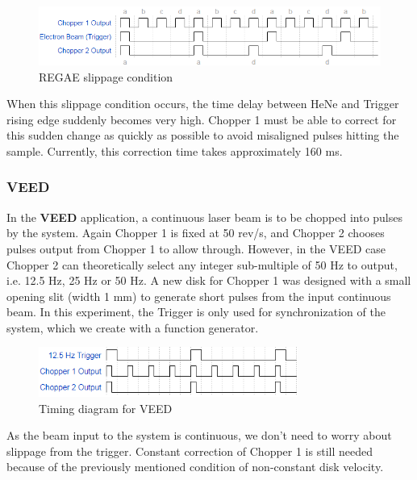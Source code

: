 \documentclass{article}
\begin{document}
        \begin{figure}[h]
            \centering
            \includegraphics[width=12.5cm]{img/regae_slippage}
            \caption{REGAE slippage condition}
            \label{fig:regae_slippage}
        \end{figure}
        
        When this slippage condition occurs, the time delay between HeNe and Trigger rising edge suddenly becomes very high. Chopper 1 must be able to correct for this sudden change as quickly as possible to avoid misaligned pulses hitting the sample. Currently, this correction time takes approximately 160 ms.
    
    \subsubsection{VEED}
    
        In the \textbf{VEED} application, a continuous laser beam is to be chopped into pulses by the system. Again Chopper 1 is fixed at 50 rev/s, and Chopper 2 chooses pulses output from Chopper 1 to allow through. However, in the VEED case Chopper 2 can theoretically select any integer sub-multiple of 50 Hz to output, i.e. 12.5 Hz, 25 Hz or 50 Hz. A new disk for Chopper 1 was designed with a small opening slit (width 1 mm) to generate short pulses from the input continuous beam. In this experiment, the Trigger is only used for synchronization of the system, which we create with a function generator.
        
        \begin{figure}[h]
            \centering
            \includegraphics[width=8.5cm]{img/veed_timing}
            \caption{Timing diagram for VEED}
            \label{fig:veed_timing}
        \end{figure}
        
        As the beam input to the system is continuous, we don't need to worry about slippage from the trigger. Constant correction of Chopper 1 is still needed because of the previously mentioned condition of non-constant disk velocity.
    
\end{document}
